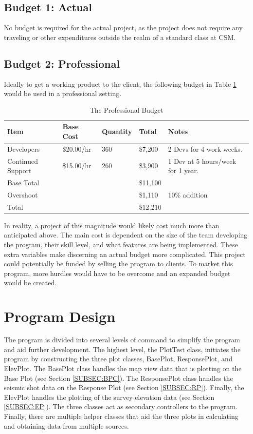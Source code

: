 \documentclass[12pt]{article}
\begin{document}
\subsection{Budget 1: Actual}

No budget is required for the actual project, as the project does not require any traveling or other expenditures outside the realm of a standard class at CSM.

\subsection{Budget 2: Professional}

Ideally to get a working product to the client, the following budget in Table \ref{TAB:BUG} would be used in a professional setting. 

\begin{table}[h]
\caption{The Professional Budget}
\begin{tabular}{ l | l | l || l | l}
  \hline                        
  Item & Base Cost & Quantity & Total & Notes \\ \hline
  Developers & \$20.00/hr & 360 & \$7,200 & 2 Devs for 4 work weeks.\\
  Continued Support & \$15.00/hr & 260 & \$3,900 & 1 Dev at 5 hours/week for 1 year.\\ \hline
  Base Total & & & \$11,100 & \\
  Overshoot & & & \$1,110 & 10\% addition\\ \hline
  Total & & & \$12,210 & \\
  \hline  
\end{tabular} 
\label{TAB:BUG}
\end{table}

In reality, a project of this magnitude would likely cost much more than anticipated above. The main cost is dependent on the size of the team developing the program, their skill level, and what features are being implemented. These extra variables make discerning an actual budget more complicated. This project could potentially be funded by selling the program to clients. To market this program, more hurdles would have to be overcome and an expanded budget would be created.

\section{Program Design}

The program is divided into several levels of command to simplify the program and aid further development. The highest level, the PlotTest class, initiates the program by constructing the three plot classes, BasePlot, ResponsePlot, and ElevPlot. The BasePlot class handles the map view data that is plotting on the Base Plot (see Section \ref{SUBSEC:BPC}). The ResponsePlot class handles the seismic shot data on the Response Plot (see Section \ref{SUBSEC:RP}). Finally, the ElevPlot handles the plotting of the survey elevation data (see Section \ref{SUBSEC:EP}). The three classes act as secondary controllers to the program. Finally, there are multiple helper classes that aid the three plots in calculating and obtaining data from multiple sources. \\
\end{document}
